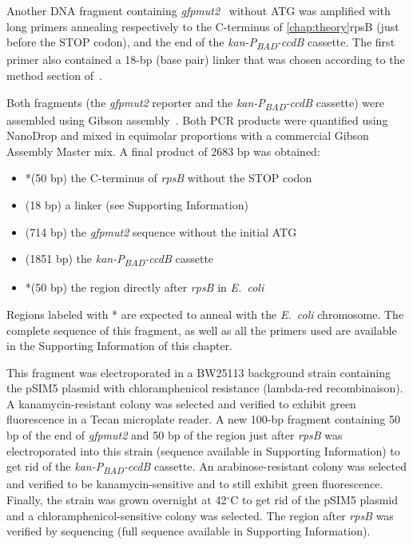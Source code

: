 Another DNA fragment containing \textit{gfpmut2}~\cite{zaslaver_comprehensive_2006} without ATG was amplified with long primers annealing respectively to the C-terminus of \ref{chap:theory}rpsB (just before the STOP codon), and the end of the \textit{kan-P\textsubscript{BAD}-ccdB} cassette.
The first primer also contained a 18-bp (base pair) linker that was chosen according to the method section of~\cite{bakshi_superresolution_2012}.

Both fragments (the \textit{gfpmut2} reporter and the \textit{kan-P\textsubscript{BAD}-ccdB} cassette) were assembled using Gibson assembly~\cite{gibson_enzymatic_2009}.
Both PCR products were quantified using NanoDrop and mixed in equimolar proportions with a commercial Gibson Assembly Master mix.
A final product of 2683 bp was obtained:
\begin{itemize}
\item *(50 bp) the C-terminus of \textit{rpsB} without the STOP codon 
\item (18 bp) a linker (see Supporting Information)
\item (714 bp) the \textit{gfpmut2} sequence without the initial ATG
\item (1851 bp) the \textit{kan-P\textsubscript{BAD}-ccdB} cassette
\item *(50 bp) the region directly after \textit{rpsB} in \textit{E.~coli}
\end{itemize}
Regions labeled with * are expected to anneal with the \textit{E.~coli} chromosome.
The complete sequence of this fragment, as well as all the primers used are available in the Supporting Information of this chapter.

This fragment was electroporated in a BW25113 background strain containing the pSIM5 plasmid with chloramphenicol resistance (lambda-red recombinaison).
A kanamycin-resistant colony was selected and verified to exhibit green fluorescence in a Tecan microplate reader.
A new 100-bp fragment containing 50 bp of the end of \textit{gfpmut2} and 50 bp of the region just after \textit{rpsB} was electroporated into this strain (sequence available in Supporting Information) to get rid of the \textit{kan-P\textsubscript{BAD}-ccdB} cassette.
An arabinose-resistant colony was selected and verified to be kanamycin-sensitive and to still exhibit green fluorescence.
Finally, the strain was grown overnight at 42$^\circ$C to get rid of the pSIM5 plasmid and a chloramphenicol-sensitive colony was selected.
The region after \textit{rpsB} was verified by sequencing (full sequence available in Supporting Information).

